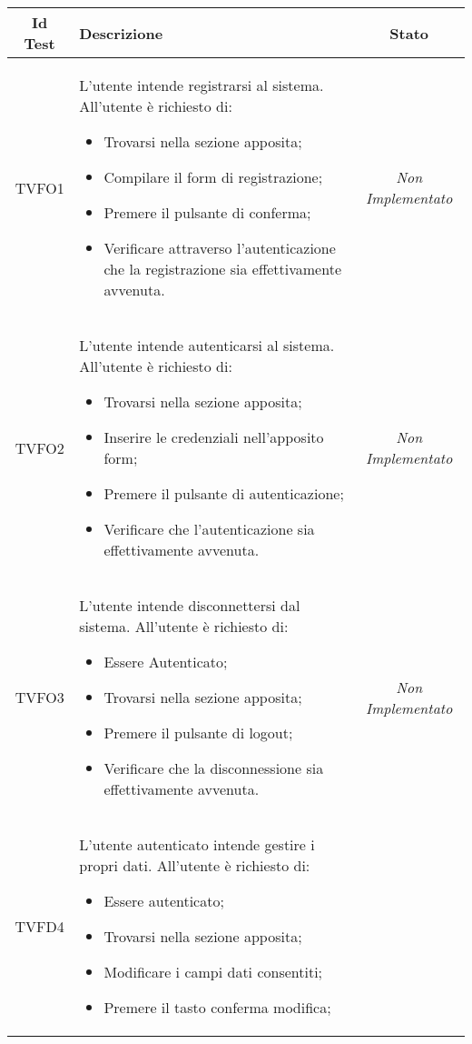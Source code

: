 \normalsize
\begin{longtable}[ht]{|c|>{}m{8cm}|c|}
\hline 
\textbf{Id Test} & \textbf{Descrizione} & \textbf{Stato}\\
\hline
\endhead
\hypertarget{TVFO1}{TVFO1} & L’utente intende registrarsi al sistema. All’utente è richiesto di:
\begin{itemize}
\item Trovarsi nella sezione apposita;
\item Compilare il form di registrazione;
\item Premere il pulsante di conferma;
\item Verificare attraverso l’autenticazione che la registrazione sia effettivamente avvenuta.
\end{itemize}
 & \textit{Non Implementato}\\ \hline
\hypertarget{TVFO2}{TVFO2} & L’utente intende autenticarsi al sistema. All’utente è richiesto di:
\begin{itemize}
\item Trovarsi nella sezione apposita;
\item Inserire le credenziali nell’apposito form;
\item Premere il pulsante di autenticazione;
\item Verificare che l’autenticazione sia effettivamente avvenuta.
\end{itemize}
 & \textit{Non Implementato}\\ \hline
\hypertarget{TVFO3}{TVFO3} & L’utente intende disconnettersi dal sistema. All’utente è richiesto di:
\begin{itemize}
\item Essere Autenticato;
\item Trovarsi nella sezione apposita;
\item Premere il pulsante di logout;
\item Verificare che la disconnessione sia effettivamente avvenuta.
\end{itemize}
 & \textit{Non Implementato}\\ \hline
\hypertarget{TVFD4}{TVFD4} & L’utente autenticato  intende gestire i propri dati. All’utente è richiesto di:
\begin{itemize}
\item Essere autenticato;
\item Trovarsi nella sezione apposita;
\item Modificare i campi dati consentiti;
\item Premere il tasto conferma modifica;

\end{itemize}
\end{longtable}
